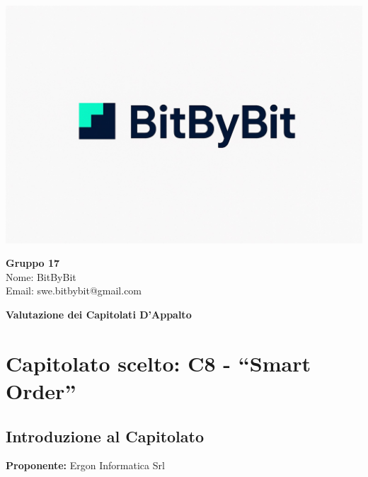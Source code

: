 \documentclass[a4paper,12pt]{article}
\begin{document}
\begin{center}
    \begin{minipage}{0.25\textwidth}
        \centering
        \includegraphics[width=\linewidth]{logo.png}
    \end{minipage}
    \hfill
    \begin{minipage}{0.7\textwidth}
        \raggedright
        {\LARGE \textbf{Gruppo 17}}\\[0.3cm]
        {\large
        Nome: BitByBit\\
        Email: swe.bitbybit@gmail.com
        }
    \end{minipage}
\end{center}

\vspace{1.5cm}

\begin{center}
    {\LARGE \textbf{Valutazione dei Capitolati D'Appalto}}
\end{center}

\vspace*{\fill} %

\clearpage


\clearpage
\tableofcontents
\thispagestyle{empty} %
\clearpage

\section{Capitolato scelto: C8 - ``Smart Order''}

\subsection{Introduzione al Capitolato}
\textbf{Proponente:} Ergon Informatica Srl
\end{document}
